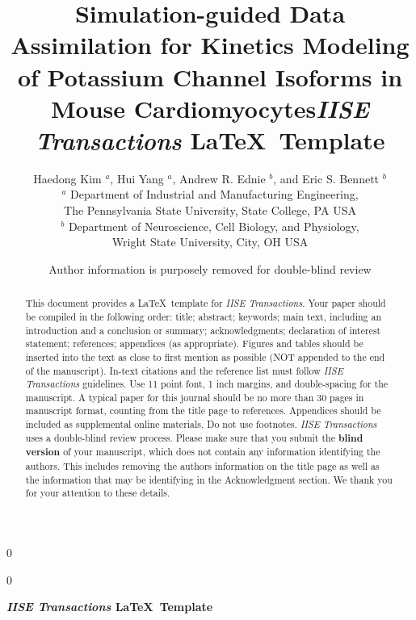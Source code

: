 \documentclass[11pt]{article}
\newcommand{\blind}{0}
\begin{document}
	
	\def\spacingset#1{\renewcommand{\baselinestretch}%
		{#1}\small\normalsize} \spacingset{1}
	
	\blind
	{
		\title{\bf Simulation-guided Data Assimilation for Kinetics Modeling of Potassium Channel Isoforms in Mouse Cardiomyocytes}
		\author{Haedong Kim $^a$, Hui Yang $^a$, Andrew R. Ednie $^b$, and Eric S. Bennett $^b$ \\
		$^a$ Department of Industrial and Manufacturing Engineering, \\
		The Pennsylvania State University, State College, PA USA \\
        $^b$ Department of Neuroscience, Cell Biology, and Physiology, \\
        Wright State University, City, OH USA}
		\date{}
		\maketitle
	} \fi
	
	\blind
	{
        \title{\bf \emph{IISE Transactions} \LaTeX \ Template}
		\author{Author information is purposely removed for double-blind review}
		
\bigskip
		\bigskip
		\bigskip
		\begin{center}
			{\LARGE\bf \emph{IISE Transactions} \LaTeX \ Template}
		\end{center}
		\medskip
	} \fi
	\bigskip
		
\begin{abstract}
This document provides a \LaTeX \ template for \emph{IISE Transactions}. Your paper should be compiled in the following order: title; abstract; keywords; main text, including an introduction and a conclusion or summary; acknowledgments; declaration of interest statement; references; appendices (as appropriate). Figures and tables should be inserted into the text as close to first mention as possible (NOT appended to the end of the manuscript). In-text citations and the reference list must follow \emph{IISE Transactions} guidelines. Use 11 point font, 1 inch margins, and double-spacing for the manuscript. A typical paper for this journal should be no more than 30 pages in manuscript format, counting from the title page to references. Appendices should be included as supplemental online materials. Do not use footnotes. \emph{IISE Transactions} uses a double-blind review process. Please make sure that you submit the \textbf{blind version} of your manuscript, which does not contain any information identifying the authors.  This includes removing the authors information on the title page as well as the information that may be identifying in the Acknowledgment section. We thank you for your attention to these details.
\end{abstract}
		
\end{document}
